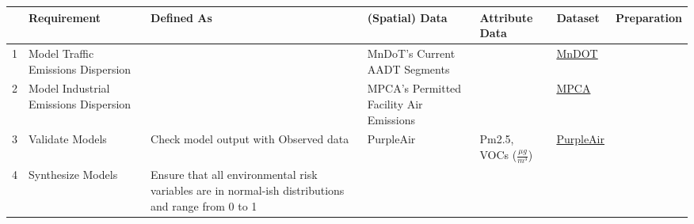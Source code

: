 \documentclass[article,12pt]{article}
\numberwithin{equation}{section}
\begin{document}
{
	\scriptsize
	\begin{tabular}{|l|p{.2\linewidth}|p{.2\linewidth}|p{.2\linewidth}|p{.1\linewidth}|p{.1\linewidth}|p{.1\linewidth}|}
	\hline	& \textbf{Requirement} & \textbf{Defined As} & \textbf{(Spatial) Data} & \textbf{Attribute Data} & \textbf{Dataset} & \textbf{Preparation} \\ \hline
		1 & Model Traffic Emissions Dispersion         &                                                                & MnDoT’s Current AADT Segments           &                                                   & \href{https://gisdata.mn.gov/dataset/trans-aadt-traffic-segments}{MnDOT}                                                                                                                 &             \\ \hline
		2 & Model Industrial Emissions Dispersion      &                                                                & MPCA’s Permitted Facility Air Emissions &                                                   & \href{https://www.pca.state.mn.us/air/permitted-facility-air-emissions-data}{MPCA}                                                                                                      &             \\ \hline
		3 & Validate Models                            & Check model output with Observed data                          & PurpleAir                               & Pm2.5, VOCs ($\frac{\mu g}{m^3}$) & \href{https://api.purpleair.com/}{PurpleAir}                                                                                                                                                 &             \\ \hline
		4 & Synthesize Models                            & Ensure that all environmental risk variables are in normal-ish distributions and range from 0 to 1 &                  &                                                   &                                                                                                                                            &             \\ \hline

\end{tabular}}
\end{document}
